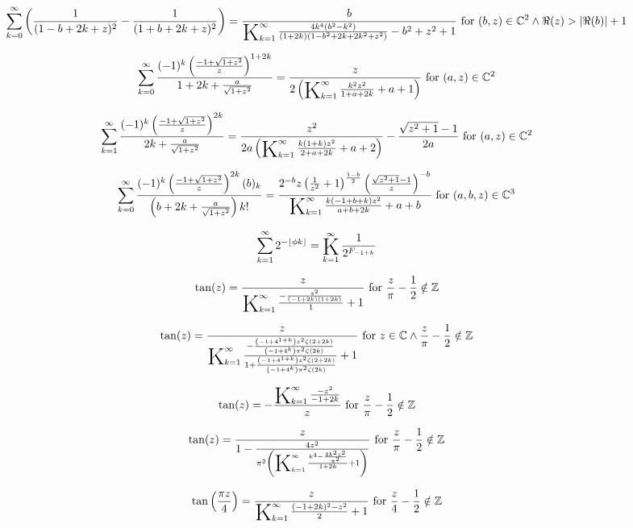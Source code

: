 \documentclass{article}
\newcommand{\bigK}{\mathop{\raisebox{-5pt}{\huge K}}}
\begin{document}
\[\sum _{k=0}^{\infty } \left(\frac{1}{(1-b+2 k+z)^2}-\frac{1}{(1+b+2 k+z)^2}\right)=\frac{b}{\bigK_{k=1}^{\infty}\frac{4 k^4 \left(b^2-k^2\right)}{(1+2 k) \left(1-b^2+2 k+2 k^2+z^2\right)}-b^2+z^2+1}\text{ for }(b,z)\in \mathbb{C}^2\land \Re(z)>\left| \Re(b)\right| +1\] 

\[\sum _{k=0}^{\infty } \frac{(-1)^k \left(\frac{-1+\sqrt{1+z^2}}{z}\right)^{1+2 k}}{1+2 k+\frac{a}{\sqrt{1+z^2}}}=\frac{z}{2 \left(\bigK_{k=1}^{\infty}\frac{k^2 z^2}{1+a+2 k}+a+1\right)}\text{ for }(a,z)\in \mathbb{C}^2\] 

\[\sum _{k=1}^{\infty } \frac{(-1)^k \left(\frac{-1+\sqrt{1+z^2}}{z}\right)^{2 k}}{2 k+\frac{a}{\sqrt{1+z^2}}}=\frac{z^2}{2 a \left(\bigK_{k=1}^{\infty}\frac{k (1+k) z^2}{2+a+2 k}+a+2\right)}-\frac{\sqrt{z^2+1}-1}{2 a}\text{ for }(a,z)\in \mathbb{C}^2\] 

\[\sum _{k=0}^{\infty } \frac{(-1)^k \left(\frac{-1+\sqrt{1+z^2}}{z}\right)^{2 k} (b)_k}{\left(b+2 k+\frac{a}{\sqrt{1+z^2}}\right) k!}=\frac{2^{-b} z \left(\frac{1}{z^2}+1\right)^{\frac{1-b}{2}} \left(\frac{\sqrt{z^2+1}-1}{z}\right)^{-b}}{\bigK_{k=1}^{\infty}\frac{k (-1+b+k) z^2}{a+b+2 k}+a+b}\text{ for }(a,b,z)\in \mathbb{C}^3\] 

\[\sum _{k=1}^{\infty } 2^{-\lfloor \phi  k\rfloor }=\bigK_{k=1}^{\infty}\frac{1}{2^{F_{-1+k}}}\] 

\[\tan (z)=\frac{z}{\bigK_{k=1}^{\infty}\frac{-\frac{z^2}{(-1+2 k) (1+2 k)}}{1}+1}\text{ for }\frac{z}{\pi }-\frac{1}{2}\notin \mathbb{Z}\] 

\[\tan (z)=\frac{z}{\bigK_{k=1}^{\infty}\frac{-\frac{\left(-1+4^{1+k}\right) z^2 \zeta (2+2 k)}{\left(-1+4^k\right) \pi ^2 \zeta (2 k)}}{1+\frac{\left(-1+4^{1+k}\right) z^2 \zeta (2+2 k)}{\left(-1+4^k\right) \pi ^2 \zeta (2 k)}}+1}\text{ for }z\in \mathbb{C}\land \frac{z}{\pi }-\frac{1}{2}\notin \mathbb{Z}\] 

\[\tan (z)=-\frac{\bigK_{k=1}^{\infty}\frac{-z^2}{-1+2 k}}{z}\text{ for }\frac{z}{\pi }-\frac{1}{2}\notin \mathbb{Z}\] 

\[\tan (z)=\frac{z}{1-\frac{4 z^2}{\pi ^2 \left(\bigK_{k=1}^{\infty}\frac{k^4-\frac{4 k^2 z^2}{\pi ^2}}{1+2 k}+1\right)}}\text{ for }\frac{z}{\pi }-\frac{1}{2}\notin \mathbb{Z}\] 

\[\tan \left(\frac{\pi  z}{4}\right)=\frac{z}{\bigK_{k=1}^{\infty}\frac{(-1+2 k)^2-z^2}{2}+1}\text{ for }\frac{z}{4}-\frac{1}{2}\notin \mathbb{Z}\] 
\end{document}
